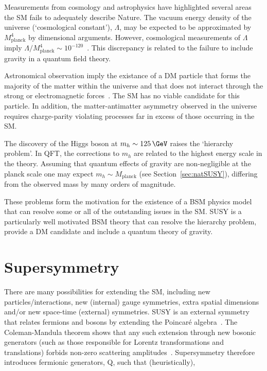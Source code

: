 Measurements from cosmology and astrophysics have highlighted several areas
the SM fails to adequately describe Nature. The vacuum energy density 
of the universe (`cosmological constant'), $\Lambda$, 
may be expected to be approximated by $M^4_{\text{planck}}$ by dimensional 
arguments. However, cosmological measurements of $\Lambda$ imply 
$\Lambda/M_{\text{planck}}^4 \sim 10^{-120}$~\cite{cosConst}. This discrepancy
is related to the failure to include gravity in a quantum field theory.

Astronomical observation imply the existance of a DM particle
that forms the majority of the matter within the universe
and that does not interact through the strong or electromagnetic forces~\cite{WIMP}.
The SM has no viable candidate for this particle. In addition, the matter-antimatter 
asymmetry observed in the universe requires 
charge-parity violating processes far in excess of those occurring in the SM.

The discovery of the Higgs boson at $m_{h}\sim125\,\GeV$ raises the `hierarchy problem'. 
In QFT, the corrections to $m_h$ are related to the highest energy scale in the theory.
Assuming that quantum effects of gravity are non-negligible at the planck scale 
one may expect $m_h \sim M_{\text{planck}}$ (see Section~\ref{sec:natSUSY}), differing
from the observed mass by many orders of magnitude.

These problems form the motivation for the existence of a BSM physics model that
can resolve some or all of the outstanding issues in the SM. SUSY is a particularly
well motivated BSM theory that can resolve the hierarchy problem, provide a DM candidate
and include a quantum theory of gravity.

\section{Supersymmetry}

There are many possibilities for extending the SM, 
including new particles/interactions, new (internal) gauge symmetries, 
extra spatial dimensions and/or new space-time (external) symmetries. SUSY is 
an external symmetry that relates fermions and bosons by extending the Poincar\'{e} algebra~\cite{SUSYP}. 
The Coleman-Mandula theorem shows that any such extension through new bosonic generators (such as those responsible for Lorentz 
transformations and translations) forbids non-zero scattering amplitudes~\cite{Coleman}. 
Supersymmetry therefore introduces fermionic generators, Q, such that (heuristically),

